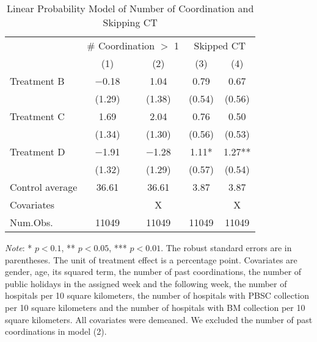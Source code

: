 \documentclass[12pt, a4paper]{article}
\begin{document}
\begin{table}[H]

\caption{\label{tab:lm-skip}Linear Probability Model of Number of Coordination and Skipping CT}
\centering
\fontsize{8}{10}\selectfont
\begin{threeparttable}
\begin{tabular}[t]{lcccc}
\toprule
\multicolumn{1}{c}{ } & \multicolumn{2}{c}{\# Coordination $>$ 1} & \multicolumn{2}{c}{Skipped CT} \\
\cmidrule(l{3pt}r{3pt}){2-3} \cmidrule(l{3pt}r{3pt}){4-5}
  & (1) & (2) & (3) & (4)\\
\midrule
Treatment B & \num{-0.18} & \num{1.04} & \num{0.79} & \num{0.67}\\
 & (\num{1.29}) & (\num{1.38}) & (\num{0.54}) & (\num{0.56})\\
Treatment C & \num{1.69} & \num{2.04} & \num{0.76} & \num{0.50}\\
 & (\num{1.34}) & (\num{1.30}) & (\num{0.56}) & (\num{0.53})\\
Treatment D & \num{-1.91} & \num{-1.28} & \num{1.11}* & \num{1.27}**\\
 & (\num{1.32}) & (\num{1.29}) & (\num{0.57}) & (\num{0.54})\\
\midrule
Control average & 36.61 & 36.61 & 3.87 & 3.87\\
Covariates &  & X &  & X\\
Num.Obs. & \num{11049} & \num{11049} & \num{11049} & \num{11049}\\
\bottomrule
\end{tabular}
\begin{tablenotes}
\item \emph{Note}: * $p < 0.1$, ** $p < 0.05$, *** $p < 0.01$. The robust standard errors are in parentheses. The unit of treatment effect is a percentage point. Covariates are gender, age, its squared term, the number of past coordinations, the number of public holidays in the assigned week and the following week, the number of hospitals per 10 square kilometers, the number of hospitals with PBSC collection per 10 square kilometers and the number of hospitals with BM collection per 10 square kilometers. All covariates were demeaned. We excluded the number of past coordinations in model (2).
\end{tablenotes}
\end{threeparttable}
\end{table}
\end{document}
